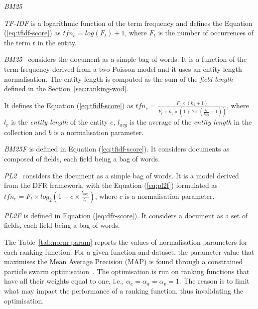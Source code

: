 \begin{labeling}{\emph{BM25~\cite{robertson:1994:sigir}}}
  \item[\emph{TF-IDF}] is a logarithmic function of the term frequency and defines the Equation (\ref{eq:tfidf-score}) as
  $
  tfn_e=log(F_t)+1
  $,
  where $F_t$ is the number of occurrences of the term $t$ in the entity.
  \item[\emph{BM25~\cite{robertson:1994:sigir}}] considers the document as a simple bag of words. It is a function of the term frequency derived from a two-Poisson model and it uses an entity-length normalisation. The entity length is computed as the sum of the \emph{field length} defined in the Section~\ref{sec:ranking-wod}.

  It defines the Equation (\ref{eq:tfidf-score}) as
  $
  tfn_e=\frac{F_t\times(k_1+1)}{F_t+k_1\times \left(1+b\times\left(\frac{l_e}{l_{avg}}-1\right)\right)}
  $,
where $l_e$ is the \emph{entity length} of the entity $e$, $l_{avg}$ is the average of the \emph{entity length} in the collection and $b$ is a normalisation parameter.
  \item[\emph{BM25F}] is defined in Equation (\ref{eq:tfidf-score}). It considers documents as composed of fields, each field being a bag of words.
  \item[\emph{PL2~\cite{amati:2002:acm}}] considers the document as a simple bag of words. It is a model derived from the DFR framework, with the Equation (\ref{eq:pl2f}) formulated as
  $
  tfn_e=F_t\times log_2\left(1+c\times\frac{l_{avg}}{l_e}\right)
  $,
  where $c$ is a normalisation parameter.
  \item[\emph{PL2F}] is defined in Equation (\ref{eq:dfr-score}). It considers a document as a set of fields, each field being a bag of words.
\end{labeling}

The Table~\ref{tab:norm-param} reports the values of normalisation parameters for each ranking function. For a given function and dataset, the parameter value that maximises the Mean Average Precision (MAP) is found through a constrained particle swarm optimisation~\cite{xiaohui:2002:sci}. The optimisation is run on ranking functions that have all their weights equal to one, i.e., $\alpha_e = \alpha_a = \alpha_v = 1$. The reason is to limit what may impact the performance of a ranking function, thus invalidating the optimisation.\\




